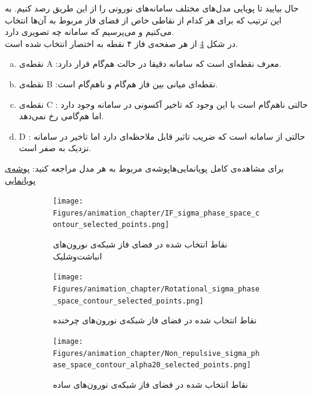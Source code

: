 حال بیایید تا پویایی مدل‌های مختلف سامانه‌های نورونی را از این طریق رصد کنیم. به این ترتیب که برای هر کدام از نقاطی خاص از فضای فاز مربوط به آن‌ها انتخاب می‌کنیم و می‌پرسیم که سامانه چه تصویری دارد.\\
در شکل‌ 
\ref{fig:abc_points_neuron_models}
از هر صفحه‌ی فاز ۴ نقطه به اختصار انتخاب شده است.
\begin{enumerate}[a.]
	\item 
	نقطه‌ی 
	A
	:معرف نقطه‌ای است که سامانه دقیقا در حالت هم‌گام قرار دارد.
	\item 
	نقطه‌ی
	B
	:نقطه‌ای میانی بین فاز هم‌گام و ناهم‌گام است.
	\item 
	نقطه‌ی
	C
	: حالتی ناهم‌گام است با این وجود که تاخیر آکسونی در سامانه وجود دارد اما هم‌گامی رخ نمی‌دهد.
	\item 
	D
	: حالتی از سامانه است که ضریب تاثیر قابل ملاحظه‌ای دارد اما تاخیر در سامانه نزدیک به صفر است.
\end{enumerate}
برای مشاهده‌ی کامل پویانمایی‌هاپوشه‌ی مربوط به هر مدل مراجعه کنید:
\href{https://drive.google.com/drive/folders/1iVuTAHkgfAb0rMtq1JORQ8NchS0IOrS2?usp=sharing}{پوشه‌ی پویانمایی}

\begin{figure}[!h]
	\begin{subfigure}{0.5\textwidth}
	\texttt{[image: Figures/animation\_chapter/IF\_sigma\_phase\_space\_contour\_selected\_points.png]}
	\caption{
		نقاط انتخاب شده در فضای فاز شبکه‌ی نورون‌های انباشت‌وشلیک
	}
	\label{fig:IF_abc}
	\end{subfigure}
	\hfill
	\begin{subfigure}{0.5\textwidth}
		\texttt{[image: Figures/animation\_chapter/Rotational\_sigma\_phase\_space\_contour\_selected\_points.png]}
		\caption{
		نقاط انتخاب شده در فضای فاز شبکه‌ی نورون‌های چرخنده
	}
		\label{fig:Rotational_abc}
	\end{subfigure}
	\hfill
	\begin{subfigure}{0.5\textwidth}
		\texttt{[image: Figures/animation\_chapter/Non\_repulsive\_sigma\_phase\_space\_contour\_alpha20\_selected\_points.png]}
		\caption{
		نقاط انتخاب شده در فضای فاز شبکه‌ی نورون‌های ساده
		}
		\label{fig:Non_repulsive_abc}
	\end{subfigure}
	\hfill
	\caption{}
	\label{fig:abc_points_neuron_models}
\end{figure}

\newpage

